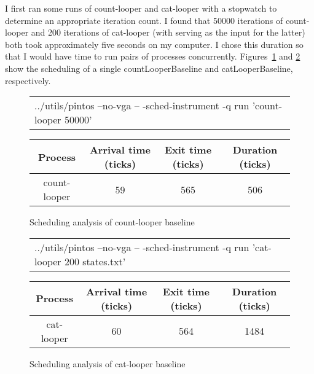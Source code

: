 \documentclass{article}
\newcommand{\command}[1]{{\sffamily#1}}
\begin{document}
I first ran some runs of \command{count-looper} and \command{cat-looper} with a stopwatch
to determine an appropriate iteration count. I found that \num{50000} iterations of \command{count-looper}
and \num{200} iterations of \command{cat-looper} (with  serving as the input for the latter) both took approximately five seconds
on my computer.
I chose this duration so that I would have time to run pairs of processes concurrently.
Figures~\ref{fig:countLooperBaseline} and \ref{fig:catLooperBaseline} show
the scheduling of a single \command{countLooperBaseline} and \command{catLooperBaseline},
respectively.

\begin{landscape}
\begin{figure}
\centering

\begin{tabular}{l}
\command{../utils/pintos --no-vga -- -sched-instrument -q run 'count-looper 50000'}
\end{tabular}

\vspace{1em}



\vspace{1em}

\begin{tabular}{cccc}\toprule
Process & Arrival time (ticks) & Exit time (ticks) & Duration (ticks)\\\hline
\command{count-looper} & \num{59} & \num{565} & \num{506} \\\bottomrule
\end{tabular}
\caption{Scheduling analysis of count-looper baseline}
\label{fig:countLooperBaseline}
\end{figure}
\end{landscape}

\begin{landscape}
\begin{figure}
\centering

\begin{tabular}{l}
\command{../utils/pintos --no-vga -- -sched-instrument -q run 'cat-looper 200 states.txt'}
\end{tabular}

\vspace{1em}



\vspace{1em}

\begin{tabular}{cccc}\toprule
Process & Arrival time (ticks) & Exit time (ticks) & Duration (ticks)\\\hline
\command{cat-looper} & \num{60} & \num{564} & \num{1484} \\\bottomrule
\end{tabular}
\caption{Scheduling analysis of cat-looper baseline}
\label{fig:catLooperBaseline}
\end{figure}
\end{landscape}
\end{document}

